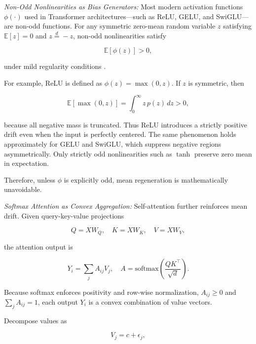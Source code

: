\noindent \emph{Non-Odd Nonlinearities as Bias Generators:} Most modern activation functions $\phi(\cdot)$ used in
Transformer architectures—such as ReLU, GELU, and SwiGLU—
are non-odd functions.
For any symmetric zero-mean random variable $z$ satisfying
$\mathbb{E}[z] = 0$ and $z \overset{d}{=} -z$,
non-odd nonlinearities satisfy

\begin{equation}
\mathbb{E}[\phi(z)] > 0,
\label{eq:non_odd_bias}
\end{equation}

under mild regularity conditions
\cite{timkey2021rogue,puccetti2022frequency}.

For example, ReLU is defined as $\phi(z) = \max(0,z)$.
If $z$ is symmetric, then

\begin{equation}
\mathbb{E}[\max(0,z)]
=
\int_{0}^{\infty} z\, p(z)\, dz
>
0,
\end{equation}

because all negative mass is truncated.
Thus ReLU introduces a strictly positive drift even when
the input is perfectly centered.
The same phenomenon holds approximately for GELU and SwiGLU,
which suppress negative regions asymmetrically.
Only strictly odd nonlinearities such as $\tanh$
preserve zero mean in expectation.

Therefore, unless $\phi$ is explicitly odd,
mean regeneration is mathematically unavoidable.

\noindent \emph{Softmax Attention as Convex Aggregation:}
Self-attention further reinforces mean drift.
Given query-key-value projections

\begin{equation}
Q = XW_Q,\quad K = XW_K,\quad V = XW_V,
\end{equation}

the attention output is

\begin{equation}
Y_i = \sum_{j} A_{ij} V_j,
\quad
A = \mathrm{softmax}\!\left(\frac{QK^\top}{\sqrt{d}}\right).
\end{equation}

Because softmax enforces positivity and row-wise normalization,
$A_{ij} \ge 0$ and $\sum_j A_{ij} = 1$,
each output $Y_i$ is a convex combination of value vectors.

Decompose values as

\begin{equation}
V_j = c + \epsilon_j,
\end{equation}

